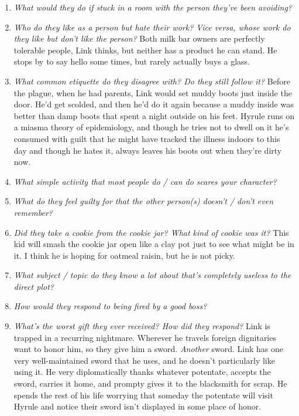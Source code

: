 \begin{enumerate}
    \item\textit{What would they do if stuck in a room with the person they’ve been avoiding?}
    \item\textit{Who do they like as a person but hate their work? Vice versa, whose work do they like but don’t like the person?}
        Both milk bar owners are perfectly tolerable people, Link thinks, but neither has a product he can stand. He stops by to say hello some times, but rarely actually buys a glass.
    \item\textit{What common etiquette do they disagree with? Do they still follow it?}\label{link:characterq:etiquette}
        Before the plague, when he had parents, Link would set muddy boots just inside the door. He'd get scolded, and then he'd do it again because a muddy inside was better than damp boots that spent a night outside on his feet. Hyrule runs on a miasma theory of epidemiology, and though he tries not to dwell on it he's consumed with guilt that he might have tracked the illness indoors to this day and though he hates it, always leaves his boots out when they're dirty now.
    \item\textit{What simple activity that most people do / can do scares your character?}
    \item\textit{What do they feel guilty for that the other person(s) doesn’t / don’t even remember?}
    \item\textit{Did they take a cookie from the cookie jar? What kind of cookie was it?}
        This kid will smash the cookie jar open like a clay pot just to see what might be in it. I think he is hoping for oatmeal raisin, but he is not picky.
    \item\textit{What subject / topic do they know a lot about that’s completely useless to the direct plot?}
    \item\textit{How would they respond to being fired by a good boss?}
    \item\textit{What’s the worst gift they ever received? How did they respond?}
        Link is trapped in a recurring nightmare. Wherever he travels foreign dignitaries want to honor him, so they give him a sword. \emph{Another} sword. Link has one very well-maintained sword that he uses, and he doesn't particularly like using it. He very diplomatically thanks whatever potentate, accepts the sword, carries it home, and prompty gives it to the blacksmith for scrap. He spends the rest of his life worrying that someday the potentate will visit Hyrule and notice their sword isn't displayed in some place of honor.

\end{enumerate}
